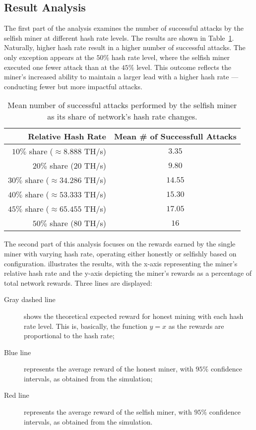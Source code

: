 \subsection{Result Analysis}\label{subsec:selfish-analysis}

The first part of the analysis examines the number of successful attacks
by the selfish miner at different hash rate levels. The results
are shown in Table~\ref{tab:selfish-attacks}. Naturally, higher hash rate
result in a higher number of successful attacks. The only exception appears at
the \(50\%\) hash rate level, where the selfish miner executed one fewer attack
than at the \(45\%\) level. This outcome reflects the miner's increased ability
to maintain a larger lead with a higher hash rate --- conducting fewer but more
impactful attacks.

\begin{table}[tbhp]
	\centering
	\begin{tabular}{|r|c|}
		\toprule
		Relative Hash Rate & Mean \# of Successfull Attacks \\
		\midrule
		\(10\%\) share (\(\approx8.888\) TH/s) & \(3.35\) \\[6pt]
		\(20\%\) share (\(20\) TH/s) & \(9.80\) \\[6pt]
		\(30\%\) share (\(\approx34.286\) TH/s) & \(14.55\) \\[6pt]
		\(40\%\) share (\(\approx53.333\) TH/s) & \(15.30\) \\[6pt]
		\(45\%\) share (\(\approx65.455\) TH/s) & \(17.05\) \\[6pt]
		\(50\%\) share (\(80\) TH/s) & \(16\) \\
		\bottomrule
	\end{tabular}
	\caption{Mean number of successful attacks performed by the selfish
	miner as its share of network's hash rate
	changes.}\label{tab:selfish-attacks}
\end{table}

The second part of this analysis focuses on the rewards earned by the single
miner with varying hash rate, operating either honestly or selfishly based on
configuration.   illustrates the results, with the
x-axis representing the miner's relative hash rate and the y-axis depicting the
miner's rewards as a percentage of total network rewards. Three lines are
displayed:
\begin{description}
	\item[Gray dashed line] shows the theoretical expected reward for
		honest mining with each hash rate level. This is, basically,
		the function \(y = x\) as the rewards are proportional to the
		hash rate;
	\item[Blue line] represents the average reward of the honest miner,
		with \(95\%\) confidence intervals, as obtained from the
		simulation;
	\item[Red line] represents the average reward of the selfish miner,
		with \(95\%\) confidence intervals, as obtained from the
		simulation.
\end{description}

